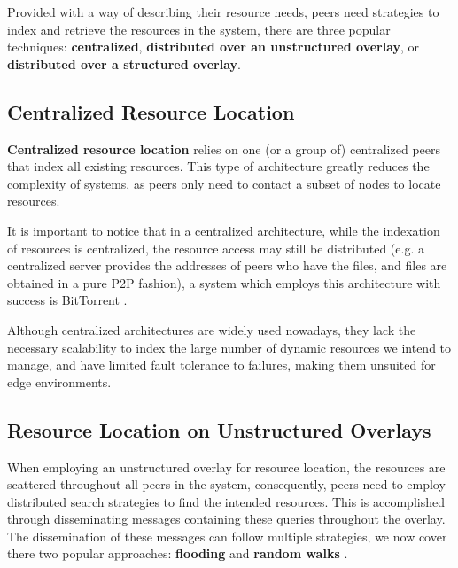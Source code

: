 Provided with a way of describing their resource needs, peers need strategies to index and retrieve the resources in the system, there are three popular techniques: \textbf{centralized}, \textbf{distributed over an unstructured overlay}, or \textbf{distributed over a structured overlay}.

\subsection{Centralized Resource Location}

\textbf{Centralized resource location} relies on one (or a group of) centralized peers that index all existing resources. This type of architecture greatly reduces the complexity of systems, as peers only need to contact a subset of nodes to locate resources. 

It is important to notice that in a centralized architecture, while the indexation of resources is centralized, the resource access may still be distributed (e.g. a centralized server provides the addresses of peers who have the files, and files are obtained in a pure P2P fashion), a system which employs this architecture with success is BitTorrent \cite{cohen2003incentives}.

Although centralized architectures are widely used nowadays, they lack the necessary scalability to index the large number of dynamic resources we intend to manage, and have limited fault tolerance to failures, making them unsuited for edge environments. 


\subsection{Resource Location on Unstructured Overlays}

When employing an unstructured overlay for resource location, the resources are scattered throughout all peers in the system, consequently, peers need to employ distributed search strategies to find the intended resources. This is accomplished through disseminating messages containing these queries throughout the overlay. The dissemination of these messages can follow multiple strategies, we now cover there two popular approaches: \textbf{flooding} and \textbf{random walks} \cite{leitaoPHDthesis}. 

